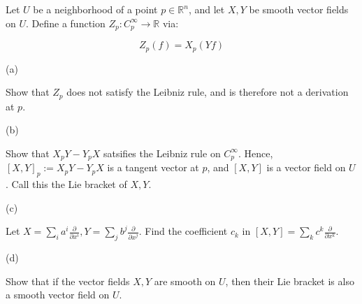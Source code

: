\documentclass[10pt]{article}
\newenvironment{problem}[2][]{\begin{trivlist}
\item[\hskip \labelsep {\bfseries #1}\hskip \labelsep {\bfseries #2.}]}{\end{trivlist}}
\begin{document}
\begin{problem}{Question 4}

Let $U$ be a neighborhood of a point $p \in \mathbb{R}^n$, and let $X,Y$ be smooth vector fields on $U$. Define a function $Z_p : C_p^\infty \to \mathbb{R}$ via:

$$Z_p(f) = X_p(Yf) $$

(a)

Show that $Z_p$ does not satisfy the Leibniz rule, and is therefore not a derivation at $p$.

(b)

Show that $X_pY  - Y_pX$ satsifies the Leibniz rule on $C_p^\infty$. Hence, $[X,Y]_p := X_p Y - Y_pX$ is a tangent vector at $p$, and $[X,Y]$ is a vector field on $U$. Call this the Lie bracket of $X, Y$.

(c)

Let $X = \sum_i a^i \frac{\partial}{\partial x^i}, Y =  \sum_j b^j \frac{\partial}{\partial x^j}$. Find the coefficient $c_k$ in $[X,Y] = \sum_k c^k \frac{\partial}{\partial x^k}$.

(d) 

Show that if the vector fields $X,Y$ are smooth on $U$, then their Lie bracket is also a smooth vector field on $U$.
\end{problem}
\end{document}
